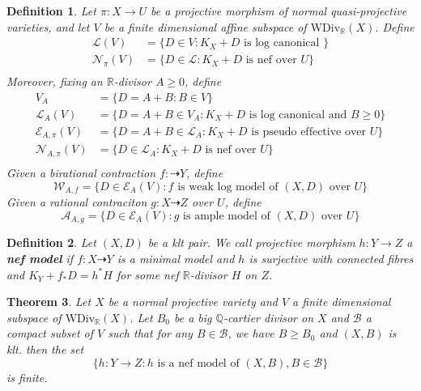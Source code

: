 \documentclass{article}
\newtheorem{defn}{Definition}[section]
\newtheorem{thm}[defn]{Theorem}
\begin{document}
\begin{defn}
  Let $ \pi:X\to U $ be a projective morphism of normal quasi-projective varieties, and  let $ V $ be a finite dimensional affine subspace of $ \mathrm{WDiv}_\mathbb{R}(X) $. Define
  \begin{equation*}
    \begin{aligned}
      \mathcal{L}(V)&=\{D\in V: K_X+D \text{ is log canonical }\} \\
      \mathcal{N}_\pi(V)&=\{D\in\mathcal{L}:K_X+D \text{ is nef over } U\}\\
    \end{aligned}
  \end{equation*}
  Moreover, fixing an $ \mathbb{R} $-divisor $ A\geqslant 0 $, define
  \begin{equation*}
    \begin{aligned}
      V_A&=\{D=A+B:B\in V\}\\
      \mathcal{L}_A(V)&=\{D=A+B\in V_A: K_X+D \text{ is log canonical and  } B\geqslant0 \}\\
      \mathcal{E}_{A,\pi}(V)&=\{D=A+B\in \mathcal{L}_A: K_X+D \text{ is pseudo effective over } U\}\\ 
      \mathcal{N}_{A,\pi}(V)&=\{D\in\mathcal{L}_A:K_X+D \text{ is nef over } U\}\\
    \end{aligned}
  \end{equation*}
  Given a birational contraction $ f:\dashrightarrow Y $, define
  $$ \mathcal{W}_{A,f}=\{D\in \mathcal{E}_{A}(V): f \text{ is weak log model of  } (X,D) \text{ over }U\} $$
  Given a rational contraciton $g:X\dashrightarrow Z  $ over $ U $, define
  $$ \mathcal{A}_{A,g}=\{D\in \mathcal{E}_{A}(V): g \text{ is ample model of  } (X,D) \text{ over }U\} $$
\end{defn}
\begin{defn}
  Let $ (X,D) $ be a klt pair. We call  projective morphism  $ h:Y\to Z $ a \textbf{nef model} if $ f:X\dashrightarrow Y $ is a minimal model and $ h $ is surjective with connected fibres and $ K_Y+f_*D=h^*H $ for some nef $ \mathbb{R} $-divisor $ H $ on $ Z $.
\end{defn}

\begin{thm}
  Let $ X $ be a normal projective variety and $ V $ a finite dimensional subspace of $ \mathrm{WDiv}_\mathbb{R}(X) $. Let $ B_0 $ be a big $ \mathbb{Q}$-cartier divisor on $ X $ and $ \mathcal{B} $ a compact subset of $ V $ such that for any $ B\in \mathcal{B} $, we have $ B\geqslant B_0 $ and $ (X,B) $ is klt. then the set
  $$ \{h:Y\to Z:  h \text{ is a nef model of } (X,B), B\in\mathcal{B} \} $$
  is finite.      
\end{thm}
\end{document}

